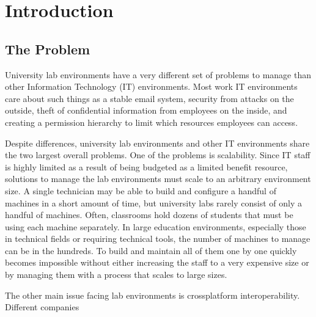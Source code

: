 \chapter{Introduction} \label{ch:introduction}
\section{The Problem} \label{sec:the_problem}
University lab environments have a very different set of problems to manage than other Information Technology (IT) environments.  Most work IT environments care about such things as a stable email system, security from attacks on the outside, theft of confidential information from employees on the inside, and creating a permission hierarchy to limit which resources employees can access.  


Despite differences, university lab environments and other IT environments share the two largest overall problems.  One of the problems is scalability.  Since IT staff is highly limited as a result of being budgeted as a limited benefit resource, solutions to manage the lab environments must scale to an arbitrary environment size.  A single technician may be able to build and configure a handful of machines in a short amount of time, but university labs rarely consist of only a handful of machines.  Often, classrooms hold dozens of students that must be using each machine separately.  In large education environments, especially those in technical fields or requiring technical tools, the number of machines to manage can be in the hundreds.  To build and maintain all of them one by one quickly becomes impossible without either increasing the staff to a very expensive size or by managing them with a process that scales to large sizes.  

The other main issue facing lab environments is crossplatform interoperability.  Different companies 



